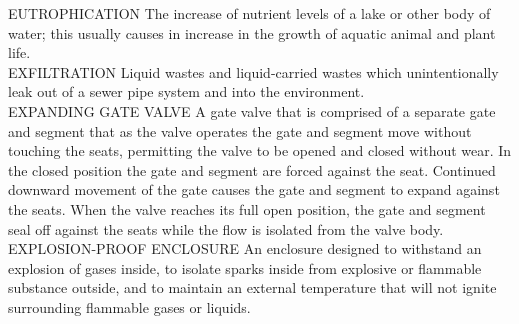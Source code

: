 EUTROPHICATION
The increase of nutrient levels of a lake or other body of water; this usually causes in increase in the growth of aquatic animal and plant life.
\vspace{0.3cm}\\
EXFILTRATION
Liquid wastes and liquid-carried wastes which unintentionally leak out of a sewer pipe system and into the environment. 
\vspace{0.3cm}\\
EXPANDING GATE VALVE
A gate valve that is comprised of a separate gate and segment that as the valve operates the gate and segment move without touching the seats, permitting the valve to be opened and closed without wear. In the closed position the gate and segment are forced against the seat. Continued downward movement of the gate causes the gate and segment to expand against the seats. When the valve reaches its full open position, the gate and segment seal off against the seats while the flow is isolated from the valve body.
\vspace{0.3cm}\\
EXPLOSION-PROOF ENCLOSURE
An enclosure designed to withstand an explosion of gases inside, to isolate sparks inside from explosive or flammable substance outside, and to maintain an external temperature that will not ignite surrounding flammable gases or liquids.
\vspace{0.3cm}\\

